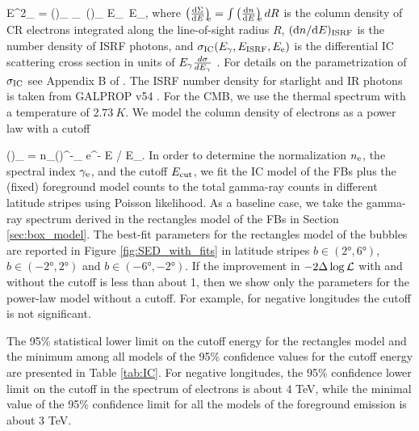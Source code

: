 \be
E^2_\g {} = 
\int \int \left(\right)_{\!\!\ISRF} \sigma_\IC\ \left(\right)_{\!\!\el} \de E_\ISRF\, \de E_\el,
\ee
where $\left(\frac{\text{d} \Sigma}{\text{d} E}\right)_{\!\!\text{e}} = \int \left(\frac{\text{d} n}{\text{d} E}\right)_{\!\!\text{e}} dR$ is the column density 
of CR electrons integrated along the line-of-sight radius $R$,
$(\text{d} n/ \text{d} E)_{\text{ISRF}}$ is the number density of ISRF photons,
and $\sigma_{\text{IC}}(E_\gamma, E_{\text{ISRF}}, E_{\text{e}})$
is the differential IC scattering cross section in units of $E_\gamma\frac{d\sigma}{d E_\gamma}$ \citep{1970RvMP...42..237B}.
For details on the parametrization of $\sigma_{\text{IC}}$ see Appendix B of \citep{2014ApJ...793...64A}.
The ISRF number density for starlight and IR photons is taken from GALPROP v54 \citep{2006ApJ...640L.155M}.
For the CMB, we use the thermal spectrum with a temperature of $\SI{2.73}{K}$.
We model the column density of electrons as a power law with a cutoff

\be 
\label{eq:e_spectrum}
\left(\right)_{\!\!\el} = n_\el \left(\right)^{-\gamma_\el} e^{- E / E_{\cut}}.
\ee
In order to determine the normalization $n_{\text{e}}$, the spectral index $\gamma_{\text{e}}$, and the cutoff  $E_{\text{cut}}$, 
we fit the IC model of the FBs plus the (fixed) foreground model counts to the 
total gamma-ray counts in different latitude stripes using Poisson likelihood.
As a baseline case, we take the gamma-ray spectrum derived in the rectangles model of the FBs in Section \ref{sec:box_model}.
The best-fit parameters for the rectangles model of the bubbles are reported in Figure \ref{fig:SED_with_fits}
in latitude stripes $b \in (\ang{2}, \ang{6})$, $b \in (-\ang{2}, \ang{2})$ and $b \in (-\ang{6}, -\ang{2})$. 
If the improvement in $-2 \Delta \log {\mathcal{L}}$ with and without the cutoff is less than about 1, then we show only the parameters for the power-law model without a cutoff.
For example, for negative longitudes the cutoff is not significant.

The 95\% statistical lower limit on the cutoff energy for the rectangles model and the minimum among all models of the 95\% confidence values for the cutoff energy
are presented in Table \ref{tab:IC}.
For negative longitudes,
the 95\% confidence lower limit on the cutoff in the spectrum of electrons is about 4 TeV,
while the minimal value of the 95\% confidence limit for all the models of the foreground emission is about 3 TeV.


